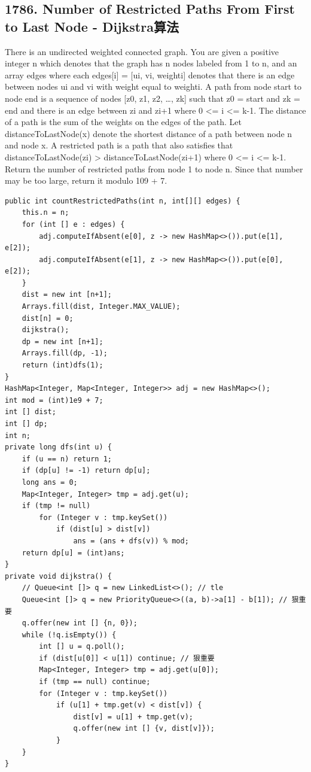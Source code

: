 \documentclass[9pt, b5paaper]{book}
\begin{document}
\subsection{1786. Number of Restricted Paths From First to Last Node - Dijkstra算法}
\label{sec-1-4-8}
There is an undirected weighted connected graph. You are given a positive integer n which denotes that the graph has n nodes labeled from 1 to n, and an array edges where each edges[i] = [ui, vi, weighti] denotes that there is an edge between nodes ui and vi with weight equal to weighti.
A path from node start to node end is a sequence of nodes [z0, z1, z2, \ldots{}, zk] such that z0 = start and zk = end and there is an edge between zi and zi+1 where 0 <= i <= k-1.
The distance of a path is the sum of the weights on the edges of the path. Let distanceToLastNode(x) denote the shortest distance of a path between node n and node x. A restricted path is a path that also satisfies that distanceToLastNode(zi) > distanceToLastNode(zi+1) where 0 <= i <= k-1.
Return the number of restricted paths from node 1 to node n. Since that number may be too large, return it modulo 109 + 7.
\begin{verbatim}
public int countRestrictedPaths(int n, int[][] edges) {
    this.n = n;
    for (int [] e : edges) {
        adj.computeIfAbsent(e[0], z -> new HashMap<>()).put(e[1], e[2]);
        adj.computeIfAbsent(e[1], z -> new HashMap<>()).put(e[0], e[2]);
    }
    dist = new int [n+1];
    Arrays.fill(dist, Integer.MAX_VALUE);
    dist[n] = 0;
    dijkstra();
    dp = new int [n+1];
    Arrays.fill(dp, -1);
    return (int)dfs(1);
}
HashMap<Integer, Map<Integer, Integer>> adj = new HashMap<>();
int mod = (int)1e9 + 7;
int [] dist;
int [] dp;
int n;
private long dfs(int u) {
    if (u == n) return 1;
    if (dp[u] != -1) return dp[u];
    long ans = 0;
    Map<Integer, Integer> tmp = adj.get(u);
    if (tmp != null) 
        for (Integer v : tmp.keySet()) 
            if (dist[u] > dist[v])
                ans = (ans + dfs(v)) % mod;
    return dp[u] = (int)ans;
}
private void dijkstra() {
    // Queue<int []> q = new LinkedList<>(); // tle 
    Queue<int []> q = new PriorityQueue<>((a, b)->a[1] - b[1]); // 狠重要
    q.offer(new int [] {n, 0});
    while (!q.isEmpty()) {
        int [] u = q.poll();
        if (dist[u[0]] < u[1]) continue; // 狠重要
        Map<Integer, Integer> tmp = adj.get(u[0]);
        if (tmp == null) continue;
        for (Integer v : tmp.keySet()) 
            if (u[1] + tmp.get(v) < dist[v]) {
                dist[v] = u[1] + tmp.get(v);
                q.offer(new int [] {v, dist[v]});
            }
    }
}
\end{verbatim}
\end{document}

